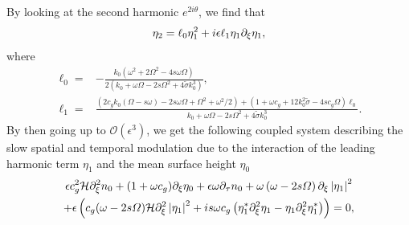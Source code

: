 \documentclass{JFM_Style/jfm}
\begin{document}
By looking at the second harmonic $e^{2i\theta}$, we find that 
\[
\eta_{2} = \ell_{0}\eta_{1}^{2} + i\epsilon\ell_{1}\eta_{1}\partial_{\xi}\eta_{1},
\]
where
\begin{align*}
\ell_{0} = & -\frac{k_{0}\left(\omega^{2}+2\Omega^{2}-4s\omega\Omega\right)}{2(k_{0} + \omega\Omega - 2s\Omega^{2} + 4\tilde{\sigma}k_{0}^{3})},\\
\ell_{1} = & \frac{\left(2c_{g}k_{0}(\Omega-s\omega)-2s\omega\Omega + \Omega^{2} + \omega^{2}/2\right)+(1+\omega c_{g} + 12k_{0}^{2}\tilde{\sigma}-4sc_{g} \Omega)\ell_{0}}{k_{0} + \omega\Omega - 2s\Omega^{2} + 4\tilde{\sigma}k_{0}^{3}}.
\end{align*}
By then going up to $\mathcal{O}(\epsilon^{3})$, we get the following coupled system describing the slow spatial and temporal modulation due to the interaction of the leading harmonic term $\eta_{1}$ and the mean surface height $\eta_{0}$
\begin{multline}
\epsilon c_{g}^{2}\mathcal{H}\partial_{\xi}^{2}n_{0} + (1+\omega c_{g})\partial_{\xi}\eta_{0} + \epsilon \omega \partial_{\tau} n_{0} + \omega\left(\omega-2s\varOmega\right)\partial_{\xi}\left|\eta_{1}\right|^{2}\\
+\epsilon\left(c_{g}(\omega-2s\varOmega)\mathcal{H}\partial_{\xi}^{2}\left|\eta_{1}\right|^{2} + is\omega c_{g}\left(\eta_{1}^{\ast}\partial_{\xi}^{2}\eta_{1}-\eta_{1}\partial_{\xi}^{2}\eta_{1}^{\ast}\right) \right) = 0,
\label{zaveq}
\end{multline}
\end{document}
